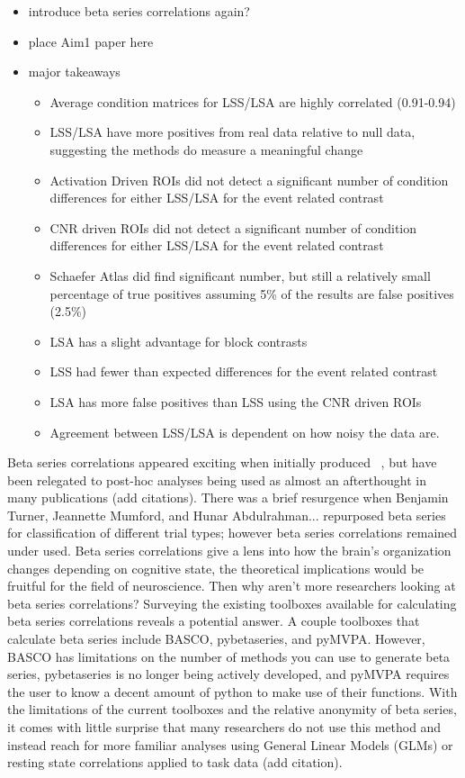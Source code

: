 \documentclass[phd,appendix,figures]{uithesis}
\begin{document}
\begin{itemize}
	\item introduce beta series correlations again?
	\item place Aim1 paper here
	\item major takeaways
	\begin{itemize}
		\item Average condition matrices for LSS/LSA are highly correlated (0.91-0.94)
		\item LSS/LSA have more positives from real data relative to null data,
		      suggesting the methods do measure a meaningful change
		\item Activation Driven ROIs did not detect a significant number of
		      condition differences for either LSS/LSA for the event related contrast
		\item CNR driven ROIs did not detect a significant number of condition differences for either
			  LSS/LSA for the event related contrast
		\item Schaefer Atlas did find significant number, but still a relatively small percentage
			  of true positives assuming 5\% of the results are false positives (2.5\%)
		\item LSA has a slight advantage for block contrasts
		\item LSS had fewer than expected differences for the event related contrast
		\item LSA has more false positives than LSS using the CNR driven ROIs
		\item Agreement between LSS/LSA is dependent on how noisy the data are.
	\end{itemize}
\end{itemize}
Beta series correlations appeared exciting when initially produced ~\citep{Rissman2004},
but have been relegated to post-hoc analyses being used as almost an afterthought in many
publications (add citations).
There was a brief resurgence when Benjamin Turner, Jeannette Mumford, and Hunar Abdulrahman... repurposed
beta series for classification of different trial types; however beta series correlations
remained under used.
Beta series correlations give a lens into how the brain's organization changes depending
on cognitive state, the theoretical implications would be fruitful for the field of neuroscience.
Then why aren't more researchers looking at beta series correlations?
Surveying the existing toolboxes available for calculating beta series correlations reveals a
potential answer.
A couple toolboxes that calculate beta series include BASCO, pybetaseries, and pyMVPA.
However, BASCO has limitations on the number of methods you can use to generate beta series,
pybetaseries is no longer being actively developed, and pyMVPA requires the user to know
a decent amount of python to make use of their functions.
With the limitations of the current toolboxes and the relative anonymity of beta series,
it comes with little surprise that many researchers do not use this method and instead reach for
more familiar analyses using General Linear Models (GLMs) or resting state correlations applied
to task data (add citation).
\end{document}
